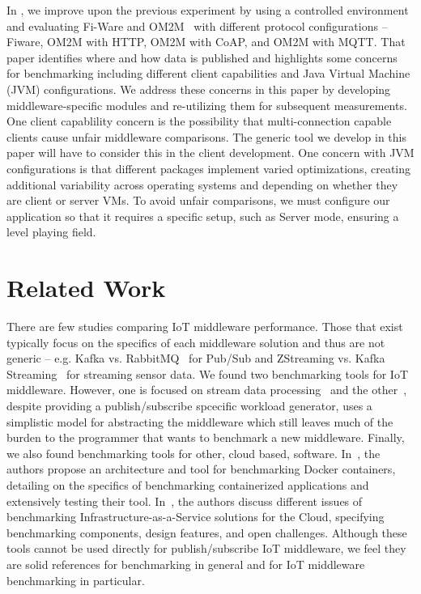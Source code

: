 \documentclass[conference]{IEEEtran}
\begin{document}
In \cite{pereira_benchmarking_2018}, we improve upon the previous experiment by using a controlled environment %
and evaluating Fi-Ware and OM2M~\cite{oneM2MHo30:online} with different protocol configurations -- Fiware, OM2M with HTTP, OM2M with CoAP, and OM2M with MQTT. That paper identifies where and how data is published and highlights some concerns for benchmarking including different client capabilities and Java Virtual Machine (JVM) configurations. %
We address these concerns in this paper by developing middleware-specific modules and re-utilizing them for subsequent measurements. One client capablility concern is the possibility that multi-connection capable clients cause unfair middleware comparisons. The generic tool we develop in this paper will have to consider this in the client development. One concern with JVM configurations is that different packages implement varied optimizations, creating additional variability across operating systems and depending on whether they are client or server VMs. To avoid unfair comparisons, we must configure our application so that it requires a specific setup, such as Server mode, ensuring a level playing field.

\section{Related Work}

There are few studies comparing IoT middleware performance. Those that exist typically focus on the specifics of each middleware solution and thus are not generic -- e.g. Kafka vs. RabbitMQ~\cite{dobbelaere_kafka_2017} for Pub/Sub and ZStreaming vs. Kafka Streaming~\cite{fernandez-rodraguez_benchmarking_2017} for streaming sensor data. We found two benchmarking tools for IoT middleware. However, one is focused on stream data processing~\cite{shukla_riotbench:_2017} and the other~\cite{zhang_psbench:_2014}, despite providing a publish/subscribe spcecific workload generator, uses a simplistic model for abstracting the middleware which still leaves much of the burden to the programmer that wants to benchmark a new middleware. Finally, we also found benchmarking tools for other, cloud based, software. In~\cite{varghese_doclite:_2016}, the authors propose an architecture and tool for benchmarking Docker containers, detailing on the specifics of benchmarking containerized applications and extensively testing their tool. In~\cite{iosup_iaas_2014}, the authors discuss different issues of benchmarking Infrastructure-as-a-Service solutions for the Cloud, specifying benchmarking components, design features, and open challenges. Although these tools cannot be used directly for publish/subscribe IoT middleware, we feel they are solid references for benchmarking in general and for IoT middleware benchmarking in particular.
\end{document}
